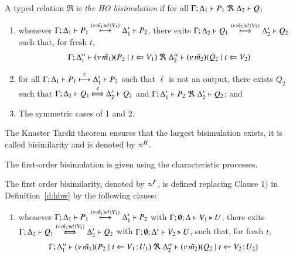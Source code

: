 \begin{definition}\rm
	\label{d:hbw}
A typed relation $\Re$ is {\em the HO bisimulation} if 
for all $\horel{\Gamma}{\Delta_1}{P_1}{\ \Re \ }{\Delta_2}{Q_1}$ 
\begin{enumerate}
\item 
whenever 
$\Gamma; \Delta_1 \vdash P_1 \stackrel{(\nu\, \tilde{m_1}) n ! \langle V_1 \rangle}{\longmapsto} \Delta_1' \vdash P_2$, there exits 
$\horel{\Gamma}{\Delta_2}{Q_1}{\Hby{\news{\tilde{m_2}} \bactout{n}{V_2}}}{\Delta_2'}{Q_2}$ such that, for fresh $t$, 
\[
\begin{array}{lrlll}
\Gamma; \Delta''_1  \vdash  {(\nu\, \tilde{m_1})(P_2 \;|\;t \Leftarrow V_1)}
\ \Re 
\ \Delta''_2 \vdash {(\nu\, \tilde{m_2})(Q_2 \;|\;t \Leftarrow V_2)}
\end{array}
\]
		\item	
for all $\Gamma; \Delta_1 \vdash P_1 \stackrel{\ell}{\longmapsto} \Delta_1' \vdash P_2$ such that 
$\ell$ is not an output, 
 there exists $Q_2$ such that 
$\horel{\Gamma}{\Delta_2}{Q_1}{\Hby{\ell}}{\Delta_2'}{Q_2}$
			and
			$\horel{\Gamma}{\Delta_1'}{P_2}{\ \Re \ }{\Delta_2'}{Q_2}$; and 

                      \item	The symmetric cases of 1 and 2.                
	\end{enumerate}
	The Knaster Tarski theorem ensures that the largest bisimulation exists,
	it is called bisimilarity and is denoted by $\approx^H$.
\end{definition}

The first-order bisimulation is given using the characteristic processes. 

\begin{definition}\rm
\label{d:fwb}
The first order bisimilarity, denoted by $\approx^F$, is defined replacing 
Clause 1) in Definition~\ref{d:hbw} by the following clause:
	\begin{enumerate}
		\item	whenever 
$\Gamma; \Delta_1 \vdash P_1 \stackrel{(\nu\, \tilde{m_1}) n ! \langle V_1 \rangle}{\longmapsto} \Delta_1' \vdash P_2$ with $\Gamma; \emptyset; \Delta \vdash V_1 \triangleright U$,  
there exits 
$\horel{\Gamma}{\Delta_2}{Q_1}{\Hby{\news{\tilde{m_2}}\bactout{n}{V_2}}}{\Delta_2'}{Q_2}$ with $\Gamma; \emptyset; \Delta' \vdash V_2 \triangleright U$,  
such that, for fresh $t$, 
\[
\hspace{-0.5cm}\begin{array}{lrlll}
\Gamma; \Delta''_1  \proves  {\newsp{\tilde{m_1}}{P_2 \Par 
\ftrigger{t}{V_1}{U_1}}}
\ \Re 
\ \Delta''_2 \proves {\newsp{\tilde{m_2}}{Q_2 \Par \ftrigger{t}{V_2}{U_2}}}
\end{array}
\]
\end{enumerate}
\end{definition}

